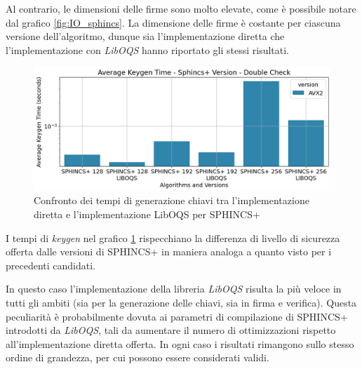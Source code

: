 Al contrario, le dimensioni delle firme sono molto elevate, come è possibile notare dal grafico \ref{fig:IO_sphincs}. La dimensione delle firme è costante per ciascuna versione dell'algoritmo, dunque sia l'implementazione diretta che l'implementazione con \textit{LibOQS} hanno riportato gli stessi risultati.

\begin{figure}[H]
    \centering
    \includegraphics[width=1\textwidth]{Immagini/20240822_i9/Time_Keygen/double_check/TM_KG_sphincs.png}
    \caption{Confronto dei tempi di generazione chiavi tra l'implementazione diretta e l'implementazione LibOQS per SPHINCS+}
    \label{fig:TM_KG_sphincs}
\end{figure}

I tempi di \textit{keygen} nel grafico \ref{fig:TM_KG_sphincs} rispecchiano la differenza di livello di sicurezza offerta dalle versioni di SPHINCS+ in maniera analoga a quanto visto per i precedenti candidati.

In questo caso l'implementazione della libreria \textit{LibOQS} risulta la più veloce in tutti gli ambiti (sia per la generazione delle chiavi, sia in firma e verifica). Questa peculiarità è probabilmente dovuta ai parametri di compilazione di SPHINCS+ introdotti da \textit{LibOQS}, tali da aumentare il numero di ottimizzazioni rispetto all'implementazione diretta offerta. In ogni caso i risultati rimangono sullo stesso ordine di grandezza, per cui possono essere considerati validi.

